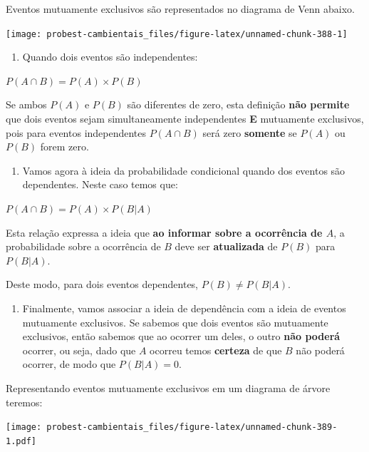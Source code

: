 \documentclass[
]{book}
\providecommand{\tightlist}{%
  \setlength{\itemsep}{0pt}\setlength{\parskip}{0pt}}
\begin{document}
Eventos mutuamente exclusivos são representados no diagrama de Venn abaixo.

\begin{center}\texttt{[image: probest-cambientais\_files/figure-latex/unnamed-chunk-388-1]} \end{center}

\begin{enumerate}
\def\labelenumi{\arabic{enumi}.}
\setcounter{enumi}{3}
\tightlist
\item
  Quando dois eventos são independentes:
\end{enumerate}

\(P(A \cap B) = P(A) \times P(B)\)

Se ambos \(P(A)\) e \(P(B)\) são diferentes de zero, esta definição \textbf{não permite} que dois eventos sejam simultaneamente independentes \textbf{E} mutuamente exclusivos, pois para eventos independentes \(P(A \cap B)\) será zero \textbf{somente} se \(P(A)\) ou \(P(B)\) forem zero.

\begin{enumerate}
\def\labelenumi{\arabic{enumi}.}
\setcounter{enumi}{4}
\tightlist
\item
  Vamos agora à ideia da probabilidade condicional quando dos eventos são dependentes. Neste caso temos que:
\end{enumerate}

\(P(A \cap B) = P(A) \times P(B|A)\)

Esta relação expressa a ideia que \textbf{ao informar sobre a ocorrência de \(A\)}, a probabilidade sobre a ocorrência de \(B\) deve ser \textbf{atualizada} de \(P(B)\) para \(P(B|A)\).

Deste modo, para dois eventos dependentes, \(P(B) \ne P(B|A)\).

\begin{enumerate}
\def\labelenumi{\arabic{enumi}.}
\setcounter{enumi}{5}
\tightlist
\item
  Finalmente, vamos associar a ideia de dependência com a ideia de eventos mutuamente exclusivos. Se sabemos que dois eventos são mutuamente exclusivos, então sabemos que ao ocorrer um deles, o outro \textbf{não poderá} ocorrer, ou seja, dado que \(A\) ocorreu temos \textbf{certeza} de que \(B\) não poderá ocorrer, de modo que \(P(B|A) = 0\).
\end{enumerate}

Representando eventos mutuamente exclusivos em um diagrama de árvore teremos:

\texttt{[image: probest-cambientais\_files/figure-latex/unnamed-chunk-389-1.pdf]}
\end{document}
